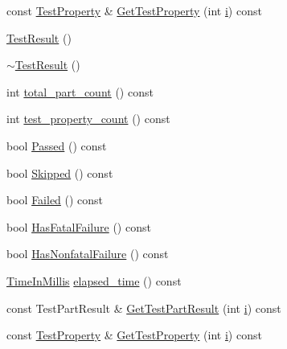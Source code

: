 \begin{DoxyCompactItemize}
\item 
const \mbox{\hyperlink{classtesting_1_1_test_property}{Test\+Property}} \& \mbox{\hyperlink{classtesting_1_1_test_result_a6c2f478dbce36b57d18bedded46d70af}{Get\+Test\+Property}} (int \mbox{\hyperlink{_obj__test_2lib_2googletest-master_2googlemock_2test_2gmock-matchers__test_8cc_acb559820d9ca11295b4500f179ef6392}{i}}) const
\item 
\mbox{\hyperlink{classtesting_1_1_test_result_a5cf5dd6f416b7334ea601aab21a2fda5}{Test\+Result}} ()
\item 
\mbox{\hyperlink{classtesting_1_1_test_result_a41f407680b725b75d7eadc3230bc3315}{$\sim$\+Test\+Result}} ()
\item 
int \mbox{\hyperlink{classtesting_1_1_test_result_a6174aa4019dcda7c34d776b5741c9032}{total\+\_\+part\+\_\+count}} () const
\item 
int \mbox{\hyperlink{classtesting_1_1_test_result_afe4523257bbea8bc63b0950b702790be}{test\+\_\+property\+\_\+count}} () const
\item 
bool \mbox{\hyperlink{classtesting_1_1_test_result_acf7e6e72f05a0545c48ea48e7f8851df}{Passed}} () const
\item 
bool \mbox{\hyperlink{classtesting_1_1_test_result_a4c9e954e0f8c1386206f2e6208c45244}{Skipped}} () const
\item 
bool \mbox{\hyperlink{classtesting_1_1_test_result_afacc37e8b43c8574e4101bc61723c769}{Failed}} () const
\item 
bool \mbox{\hyperlink{classtesting_1_1_test_result_a30e00d4076ae07fb5ad7b623d9dc1fe4}{Has\+Fatal\+Failure}} () const
\item 
bool \mbox{\hyperlink{classtesting_1_1_test_result_a510564fa67b485ed4589a259f2a032d6}{Has\+Nonfatal\+Failure}} () const
\item 
\mbox{\hyperlink{namespacetesting_a992de1d091ce660f451d1e8b3ce30fd6}{Time\+In\+Millis}} \mbox{\hyperlink{classtesting_1_1_test_result_a717e05e00d4af5cb809433e343ab63af}{elapsed\+\_\+time}} () const
\item 
const Test\+Part\+Result \& \mbox{\hyperlink{classtesting_1_1_test_result_a910b410d0d1e066cd9e182f9e07d1933}{Get\+Test\+Part\+Result}} (int \mbox{\hyperlink{_obj__test_2lib_2googletest-master_2googlemock_2test_2gmock-matchers__test_8cc_acb559820d9ca11295b4500f179ef6392}{i}}) const
\item 
const \mbox{\hyperlink{classtesting_1_1_test_property}{Test\+Property}} \& \mbox{\hyperlink{classtesting_1_1_test_result_a491ede3939a9ca508e338929762cb148}{Get\+Test\+Property}} (int \mbox{\hyperlink{_obj__test_2lib_2googletest-master_2googlemock_2test_2gmock-matchers__test_8cc_acb559820d9ca11295b4500f179ef6392}{i}}) const

\end{DoxyCompactItemize}
